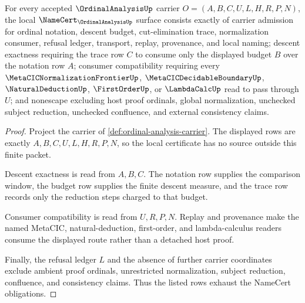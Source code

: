 \begin{theorem}
\label{thm:ordinal-analysis-namecert-obligations}
For every accepted $\OrdinalAnalysisUp$ carrier $O=(A,B,C,U,L,H,R,P,N)$, the local $\NameCert_{\OrdinalAnalysisUp}$ surface consists exactly of carrier admission for ordinal notation, descent budget, cut-elimination trace, normalization consumer, refusal ledger, transport, replay, provenance, and local naming; descent exactness requiring the trace row $C$ to consume only the displayed budget $B$ over the notation row $A$; consumer compatibility requiring every $\MetaCICNormalizationFrontierUp$, $\MetaCICDecidableBoundaryUp$, $\NaturalDeductionUp$, $\FirstOrderUp$, or $\LambdaCalcUp$ read to pass through $U$; and nonescape excluding host proof ordinals, global normalization, unchecked subject reduction, unchecked confluence, and external consistency claims.
\end{theorem}
\begin{proof}
Project the carrier of \autoref{def:ordinal-analysis-carrier}. The displayed rows are exactly $A,B,C,U,L,H,R,P,N$, so the local certificate has no source outside this finite packet.

Descent exactness is read from $A,B,C$. The notation row supplies the comparison window, the budget row supplies the finite descent measure, and the trace row records only the reduction steps charged to that budget.

Consumer compatibility is read from $U,R,P,N$. Replay and provenance make the named MetaCIC, natural-deduction, first-order, and lambda-calculus readers consume the displayed route rather than a detached host proof.

Finally, the refusal ledger $L$ and the absence of further carrier coordinates exclude ambient proof ordinals, unrestricted normalization, subject reduction, confluence, and consistency claims. Thus the listed rows exhaust the NameCert obligations.
\end{proof}

